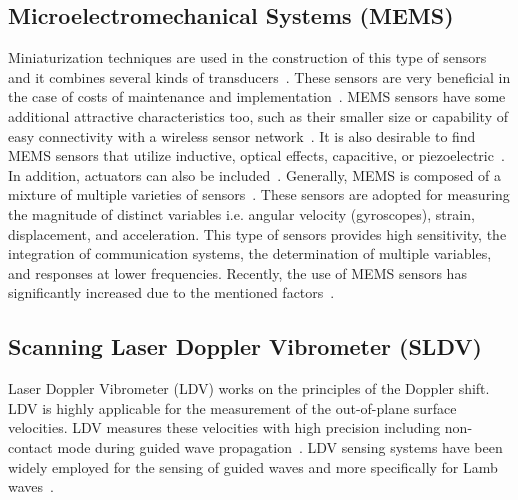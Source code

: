 \documentclass[b5paper, 11pt, titlepage]{book}
\begin{document}
\subsection{Microelectromechanical Systems (MEMS)}
Miniaturization techniques are used in the construction of this type of sensors and it combines several kinds of transducers~\cite{Zhen2017}. These sensors are very beneficial in the case of costs of maintenance and implementation~\cite{cochran2012comparison}. MEMS sensors have some additional attractive characteristics too, such as their smaller size or capability of easy connectivity with a wireless sensor network~\cite{TibaduizaBurgos2020}. It is also desirable to find MEMS sensors that utilize inductive, optical effects, capacitive, or piezoelectric~\cite{chang2013structural, Saboonchi2016}. In addition, actuators can also be included~\cite{Dixit2018}. Generally, MEMS is composed of a mixture of multiple varieties of sensors~\cite{debeda2014study}. These sensors are adopted for measuring the magnitude of distinct variables i.e. angular velocity (gyroscopes), strain, displacement, and acceleration. This type of sensors provides high sensitivity, the integration of communication systems, the determination of multiple variables, and responses at lower frequencies. Recently, the use of MEMS sensors has significantly increased due to the mentioned factors~\cite{Farrar2012, TibaduizaBurgos2020}.

\subsection{Scanning Laser Doppler Vibrometer (SLDV)}
Laser Doppler Vibrometer (LDV) works on the principles of the Doppler shift.  LDV is highly applicable for the measurement of the out-of-plane surface velocities. LDV measures these velocities with high precision including non-contact mode during guided wave propagation~\cite{Mitra2016}. LDV sensing systems have been widely employed for the sensing of guided waves and more specifically for Lamb waves~\cite{Mitra2016}. 
\end{document}
